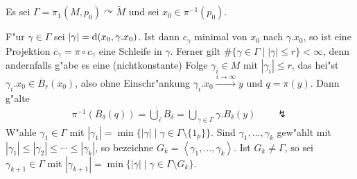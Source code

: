 \begin{emptythm}[Beweisskizze]
Es sei $\Gamma = \pi_1(M,p_0) \curvearrowright \tilde M$ und sei $x_0 \in \pi^{-1}(p_0)$.
\begin{center}\end{center}
F"ur $\gamma \in \Gamma$ sei $|\gamma| = \mathrm{d}(x_0, \gamma . x_0)$.
Ist dann $c_{\gamma}$ minimal von $x_0$ nach $\gamma . x_0$, so ist eine Projektion $\overline c_{\gamma} = \pi \circ c_{\gamma}$ eine Schleife in $\gamma$.
Ferner gilt $\#\{\gamma \in \Gamma \mid | \gamma | \leq r \} < \infty$, denn andernfalls g"abe es eine (nichtkonstante) Folge $\gamma_i \in M$ mit $|\gamma_i| \leq r$, das hei"st $\gamma_i . x_0 \in \overline B_r(x_0)$, also ohne Einschr"ankung $\gamma_i . x_0 \xrightarrow{i \to \infty} y$ und $q = \pi(y)$. Dann g"alte
\begin{align*}
	\pi^{-1}(B_{\delta}(q)) = \dot \bigcup_{i} B_{\delta} = \dot \bigcup_{\gamma \in \Gamma} \gamma . B_{\delta}(y) \qquad \lightning
\end{align*}
W"ahle $\gamma_1 \in \Gamma$ mit $|\gamma_1| = \min \{ |\gamma| \mid \gamma \in \Gamma \setminus \{1_p\} \}$.
Sind $\gamma_1, \ldots, \gamma_k$ gew"ahlt mit $|\gamma_1| \leq |\gamma_2| \leq \cdots \leq |\gamma_k|$, so bezeichne $G_k = \left< \gamma_1, \ldots, \gamma_k\right>$.
Ist $G_k \neq \Gamma$, so sei $\gamma_{k+1} \in \Gamma$ mit $|\gamma_{k+1}| = \min \{ |\gamma| \mid \gamma \in \Gamma \setminus G_k\}$.


\end{emptythm}
